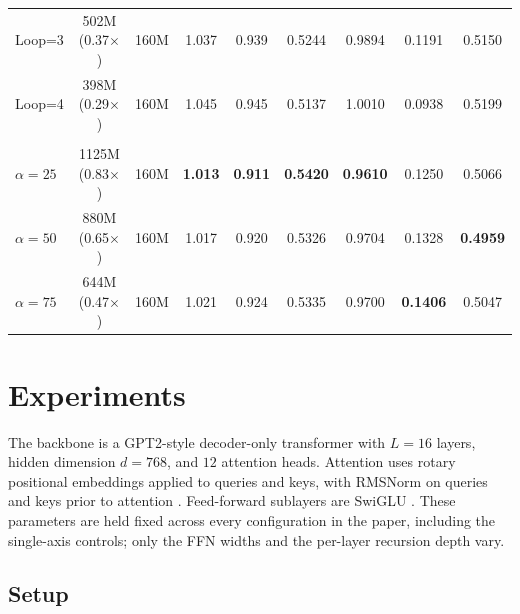 \documentclass[11pt]{article}
\begin{document}
\begin{table}[t]
\begin{tabular}{l c c cc cc cc}
\quad Loop=3 & 502M (0.37$\times$) & 160M & 1.037 & 0.939 & 0.5244 & 0.9894 & 0.1191 & 0.5150 \\
\quad Loop=4 & 398M (0.29$\times$) & 160M & 1.045 & 0.945 & 0.5137 & 1.0010 & 0.0938 & 0.5199 \\
\rowcolor{oursrow}
\multicolumn{9}{l}{\textsc{DualPath} \emph{(ours)}} \\
\rowcolor{oursrow}
\quad $\alpha=25$ & 1125M (0.83$\times$) & 160M & \textbf{1.013} & \textbf{0.911} & \textbf{0.5420} & \textbf{0.9610} & 0.1250 & 0.5066 \\
\rowcolor{oursrow}
\quad $\alpha=50$ & 880M (0.65$\times$) & 160M & 1.017 & 0.920 & 0.5326 & 0.9704 & 0.1328 & \textbf{0.4959} \\
\rowcolor{oursrow}
\quad $\alpha=75$ & 644M (0.47$\times$) & 160M & 1.021 & 0.924 & 0.5335 & 0.9700 & \textbf{0.1406} & 0.5047 \\
\bottomrule
\end{tabular}
\end{table}

\section{Experiments}
\label{sec:experiments}

The backbone is a GPT2-style \citep{radford2019language} decoder-only transformer with
$L = 16$ layers, hidden dimension $d = 768$, and $12$ attention heads. Attention
uses rotary positional embeddings \citep{su-etal-2024-rope}
applied to queries and keys, with RMSNorm on queries and keys
prior to attention \citep{dehghani-etal-2023-vit22b}. Feed-forward sublayers are SwiGLU
\citep{shazeer-2020-glu}. These parameters are held fixed across every configuration in the paper,
including the single-axis controls; only the FFN widths and the
per-layer recursion depth vary. 
 
\subsection{Setup}
\label{sec:exp:setup}
\end{document}
